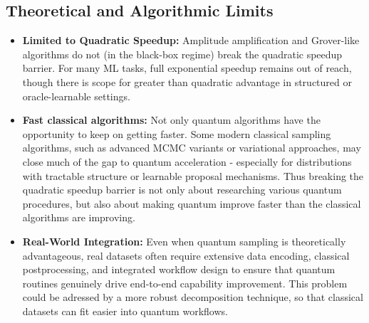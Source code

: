 \documentclass[encoding=utf8,british]{tumphthesis}
\begin{document}
        \subsection*{Theoretical and Algorithmic Limits}
        \begin{itemize}
            \item \textbf{Limited to Quadratic Speedup:} Amplitude amplification and Grover-like algorithms do not (in the black-box regime) break the quadratic speedup barrier. For many ML tasks, full exponential 
            speedup remains out of reach, though there is scope for greater than quadratic advantage in structured or oracle-learnable settings.
            \item \textbf{Fast classical algorithms:} Not only quantum algorithms have the opportunity to keep on getting faster. Some modern classical sampling algorithms, such as advanced MCMC variants or variational 
            approaches, may close much of the gap to quantum acceleration - especially for distributions with tractable structure or learnable proposal mechanisms. Thus breaking the quadratic speedup barrier is not only about 
            researching various quantum procedures, but also about making quantum improve faster than the classical algorithms are improving.
            \item \textbf{Real-World Integration:} Even when quantum sampling is theoretically advantageous, real datasets often require extensive data encoding, classical postprocessing, and integrated workflow 
            design to ensure that quantum routines genuinely drive end-to-end capability improvement. This problem could be adressed by a more robust decomposition technique, so that classical datasets can fit easier into quantum workflows.
        \end{itemize}
\end{document}

